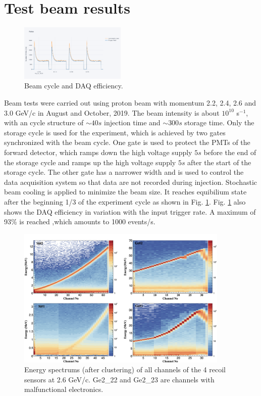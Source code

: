 \documentclass[number,5p]{elsarticle}
\begin{document}
\section{Test beam results}
\label{sec:result}

\begin{figure}[htbp]
  \centering
  \includegraphics[width=0.45\textwidth]{./daq_efficiency.png}
  \caption{Beam cycle and DAQ efficiency.}
  \label{fig:beam}
\end{figure}

Beam tests were carried out using proton beam with momentum 2.2, 2.4, 2.6 and
3.0 GeV/c in August and October, 2019.
The beam intensity is about $10^{10}$ s$^{-1}$, with an cycle structure of
$\sim40 s$ injection time and $\sim300 s$ storage time.
Only the storage cycle is used for the experiment, which is achieved by two
gates synchronized with the beam cycle.
One gate is used to protect the PMTs of the forward detector, which ramps down the high voltage supply $5s$ before the end of the
storage cycle and ramps up the high voltage supply $5s$ after the start of the storage cycle.
The other gate has a narrower width and is used to control the data
acquisition system so that data are not recorded during injection.
Stochastic beam cooling is applied to minimize the beam size. It reaches
equibilium state after the beginning 1/3 of the experiment cycle as shown in Fig. \ref{fig:beam}.
Fig. \ref{fig:beam} also shows the DAQ efficiency in variation with the input trigger rate.
A maximum of 93\% is reached ,which amounts to 1000 events/s.

\begin{figure}[htbp]
  \centering
  \includegraphics[width=0.9\textwidth]{./e_map.png}
  \caption{Energy spectrums (after clustering) of all channels of the 4 recoil
    sensors at 2.6 GeV/c. Ge2\_22 and Ge2\_23 are channels with malfunctional electronics.}
  \label{fig:e_map}
\end{figure}
\end{document}
